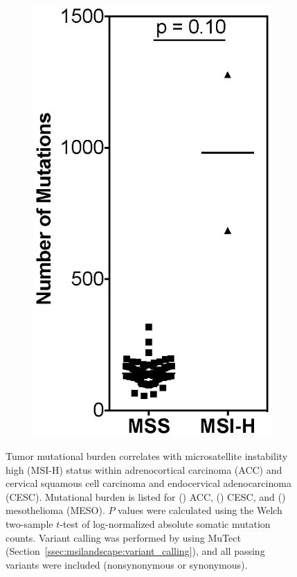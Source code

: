 \begin{figure}[ht]
\begin{subfigure}{0.25\textwidth}
		\includegraphics[width=\linewidth,keepaspectratio]{images/msilandscape/tmb_meso}
		\caption{}\label{fig:msilandscape:tmb_meso}
	\end{subfigure}%
	\hfill
	\caption[TMB correlates with MSI-H within ACC and CESC.]{Tumor mutational burden correlates with microsatellite instability high (MSI-H) status within adrenocortical carcinoma (ACC) and cervical squamous cell carcinoma and endocervical adenocarcinoma (CESC)\@. Mutational burden is listed for () ACC, () CESC, and () mesothelioma (MESO)\@. $P$ values were calculated using the Welch two-sample $t$-test of log-normalized absolute somatic mutation counts. Variant calling was performed by using MuTect (Section~\ref{ssec:msilandscape:variant_calling}), and all passing variants were included (nonsynonymous or synonymous).}
	\label{fig:msilandscape:tmb_acc_cesc_meso}
\end{figure}
